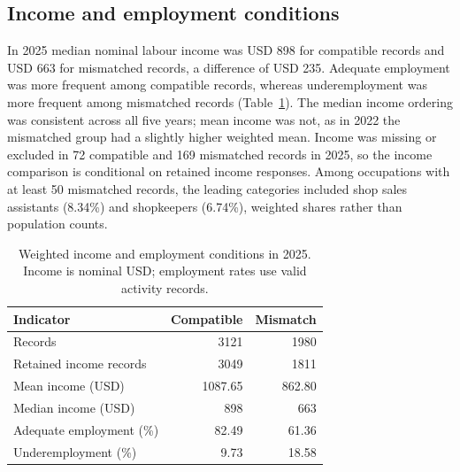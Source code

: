 \subsection{Income and employment conditions}
In 2025 median nominal labour income was USD 898 for compatible records and USD 663 for mismatched records, a difference of USD 235. Adequate employment was more frequent among compatible records, whereas underemployment was more frequent among mismatched records (Table~\ref{tab:income}). The median income ordering was consistent across all five years; mean income was not, as in 2022 the mismatched group had a slightly higher weighted mean. Income was missing or excluded in 72 compatible and 169 mismatched records in 2025, so the income comparison is conditional on retained income responses. Among occupations with at least 50 mismatched records, the leading categories included shop sales assistants (8.34\%) and shopkeepers (6.74\%), weighted shares rather than population counts.
\begin{table}[htbp]\caption{Weighted income and employment conditions in 2025. Income is nominal USD; employment rates use valid activity records.}\label{tab:income}\centering\small\begin{tabular}{lrr}\toprule Indicator & Compatible & Mismatch\\\midrule Records &3121&1980\\ Retained income records &3049&1811\\ Mean income (USD)&1087.65&862.80\\ Median income (USD)&898&663\\ Adequate employment (\%)&82.49&61.36\\ Underemployment (\%)&9.73&18.58\\\bottomrule\end{tabular}\end{table}


